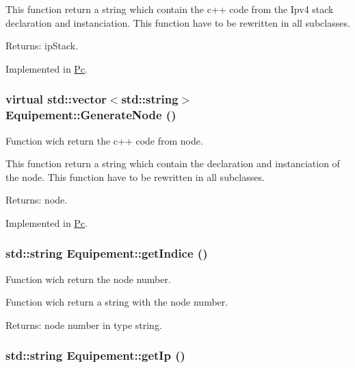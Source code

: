 This function return a string which contain the c++ code from the Ipv4 stack declaration and instanciation. This function have to be rewritten in all subclasses.

\begin{Desc}
\item[Returns:]ipStack. \end{Desc}


Implemented in \hyperlink{class_pc_1457375fb9f19d9a0270a26a8ec7b7b6}{Pc}.\hypertarget{class_equipement_df32ce167d648ff92a6420dea4e6f06e}{
\subsubsection[{GenerateNode}]{\setlength{\rightskip}{0pt plus 5cm}virtual std::vector$<$std::string$>$ Equipement::GenerateNode ()}}
\label{class_equipement_df32ce167d648ff92a6420dea4e6f06e}


Function wich return the c++ code from node. 

This function return a string which contain the declaration and instanciation of the node. This function have to be rewritten in all subclasses.

\begin{Desc}
\item[Returns:]node. \end{Desc}


Implemented in \hyperlink{class_pc_27e33b70f680c5fa0c947415c6d0a77f}{Pc}.\hypertarget{class_equipement_6074ba51d63aaeebe8293a9ba9fde31f}{
\subsubsection[{getIndice}]{\setlength{\rightskip}{0pt plus 5cm}std::string Equipement::getIndice ()}}
\label{class_equipement_6074ba51d63aaeebe8293a9ba9fde31f}


Function wich return the node number. 

Function wich return a string with the node number.

\begin{Desc}
\item[Returns:]node number in type string. \end{Desc}
\hypertarget{class_equipement_4a0b3805228532e39dcb5f83bb2d6eac}{
\subsubsection[{getIp}]{\setlength{\rightskip}{0pt plus 5cm}std::string Equipement::getIp ()}}
\label{class_equipement_4a0b3805228532e39dcb5f83bb2d6eac}


